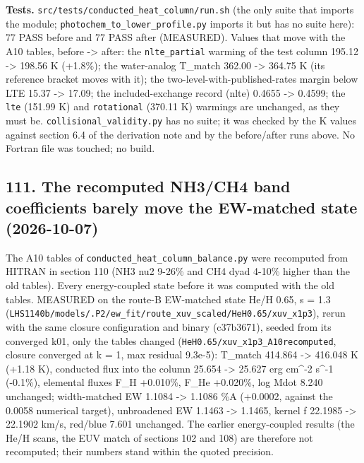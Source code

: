 \documentclass[english,a4paper]{my_memo}
\begin{document}
\textbf{Tests.} \texttt{src/tests/conducted\_heat\_column/run.sh} (the only suite that imports the
module; \texttt{photochem\_to\_lower\_profile.py} imports it but has no suite here):
77 PASS before and 77 PASS after (MEASURED). Values that move with the A10
tables, before -\textgreater{} after: the \texttt{nlte\_partial} warming of the test column
195.12 -\textgreater{} 198.56 K (+1.8\%); the water-analog T\_match 362.00 -\textgreater{} 364.75 K
(its reference bracket moves with it); the two-level-with-published-rates
margin below LTE 15.37 -\textgreater{} 17.09; the included-exchange record (nlte)
0.4655 -\textgreater{} 0.4599; the \texttt{lte} (151.99 K) and \texttt{rotational} (370.11 K) warmings
are unchanged, as they must be. \texttt{collisional\_validity.py} has no suite; it
was checked by the K values against section 6.4 of the derivation note and
by the before/after runs above. No Fortran file was touched; no build.

\subsection{111. The recomputed NH3/CH4 band coefficients barely move the EW-matched state (2026-10-07)}\label{111-the-recomputed-nh3ch4-band-coefficients-barely-move-the-ew-matched-state-2026-10-07}

The A10 tables of \texttt{conducted\_heat\_column\_balance.py} were recomputed from
HITRAN in section 110 (NH3 nu2 9-26\% and CH4 dyad 4-10\% higher than the old
tables). Every energy-coupled state before it was computed with the old
tables. MEASURED on the route-B EW-matched state He/H 0.65, s = 1.3
(\texttt{LHS1140b/models/.P2/ew\_fit/route\_xuv\_scaled/HeH0.65/xuv\_x1p3}), rerun with
the same closure configuration and binary (c37b3671), seeded from its
converged k01, only the tables changed
(\texttt{HeH0.65/xuv\_x1p3\_A10recomputed}, closure converged at k = 1, max residual
9.3e-5): T\_match 414.864 -\textgreater{} 416.048 K (+1.18 K), conducted flux into the
column 25.654 -\textgreater{} 25.627 erg cm\^{}-2 s\^{}-1 (-0.1\%), elemental fluxes F\_H +0.010\%,
F\_He +0.020\%, log Mdot 8.240 unchanged; width-matched EW 1.1084 -\textgreater{} 1.1086 \%A
(+0.0002, against the 0.0058 numerical target), unbroadened EW 1.1463 -\textgreater{}
1.1465, kernel f 22.1985 -\textgreater{} 22.1902 km/s, red/blue 7.601 unchanged. The
earlier energy-coupled results (the He/H scans, the EUV match of sections
102 and 108) are therefore not recomputed; their numbers stand within the
quoted precision.
\end{document}
